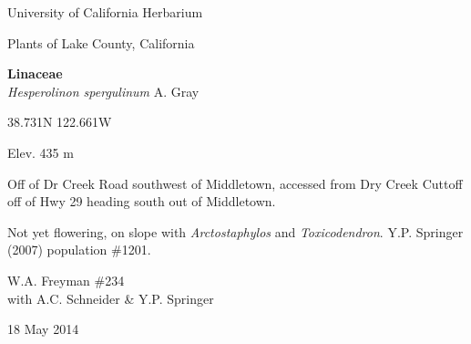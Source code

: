 \documentclass[letterpaper,10pt]{article}
\begin{document}
\begin{minipage}[t]{0.40\textwidth}

\begin{center}
University of California Herbarium \\
\begin{large}
Plants of Lake County, California \\
\end{large}
\vspace{\baselineskip}
\textbf{Linaceae} \\
\textit{Hesperolinon spergulinum} A. Gray\\
\end{center}

\begin{footnotesize}

\begin{multicols}{2}
38.731\textdegree N 122.661\textdegree W
\columnbreak
\begin{flushright}
Elev. 435 m
\end{flushright}
\end{multicols}

Off of Dr Creek Road southwest of Middletown, accessed from Dry Creek Cuttoff off of Hwy 29 heading south out of Middletown.
\vspace{\baselineskip}

Not yet flowering, on slope with \textit{Arctostaphylos} and \textit{Toxicodendron}. Y.P. Springer (2007) population \#1201.

\begin{multicols}{2}
W.A. Freyman \#234 \\
with A.C. Schneider \& Y.P. Springer
\columnbreak
\begin{flushright}
18 May 2014
\end{flushright}
\end{multicols}

\end{footnotesize}

\end{minipage}
%
\hspace{2cm}
%
\end{document}
